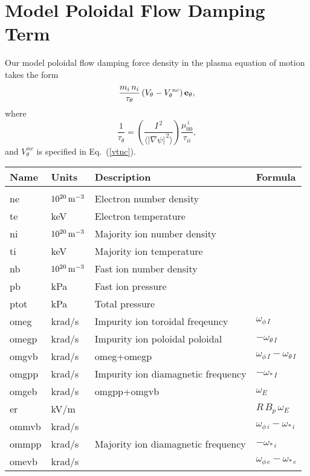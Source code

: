 \documentclass[notitlepage,12pt]{article}
\begin{document}
\section{Model Poloidal Flow Damping Term}
Our model poloidal flow damping force density in the plasma equation of motion takes the form
\begin{equation}
\frac{m_i\,n_i}{\tau_\theta}\,(V_\theta - V_\theta^{\,nc})\,{\bf e}_\theta,
\end{equation}
where		
\begin{equation}
\frac{1}{\tau_\theta} = \left(\frac{I^{\,2}}{\langle |\nabla\psi|^{\,2}\rangle}\right)\frac{\mu_{00}^{\,i}}{\tau_{ii}},
\end{equation}
and $V_\theta^{\,nc}$ is specified in Eq.~(\ref{vtnc}).

\begin{table}
\centering
\begin{tabular}{llll}\hline
Name& Units & Description& Formula\\\hline&&&\\[-2.3ex]
{\sf ne} & $10^{20}\,{\rm m}^{-3}$& Electron number density&\\
{\sf te} & keV & Electron temperature&\\
{\sf ni} & $10^{20}\,{\rm m}^{-3}$& Majority ion number density&\\
{\sf ti} & keV & Majority ion temperature&\\
{\sf nb} & $10^{20}\,{\rm m}^{-3}$& Fast ion number density&\\
{\sf pb} & kPa & Fast ion pressure&\\
{\sf ptot} & kPa & Total pressure&\\
{\sf omeg} & krad/s& Impurity ion toroidal freqeuncy&$\omega_{\phi\,I}$\\
{\sf omegp} &krad/s& Impurity ion poloidal poloidal&$-\omega_{\theta\,I}$\\
{\sf omgvb} &krad/s& {\sf omeg}+{\sf omegp}&$\omega_{\phi\,I}-\omega_{\theta\,I}$\\
{\sf omgpp} &krad/s& Impurity ion diamagnetic frequency &$-\omega_{\ast\,I}$\\
{\sf omgeb} &krad/s& {\sf omgpp}+{\sf omgvb} &$\omega_E$\\
{\sf er} &kV/m & &$R\,B_p\,\omega_E$\\
{\sf ommvb} &krad/s& &$\omega_{\phi\,i}-\omega_{\ast\,i}$\\
{\sf ommpp} &krad/s&Majority ion diamagnetic frequency&$-\omega_{\ast\,i}$\\
{\sf omevb} &krad/s& &$\omega_{\phi\,e}-\omega_{\ast\,e}$\\

\end{tabular}
\end{table}
\end{document}
